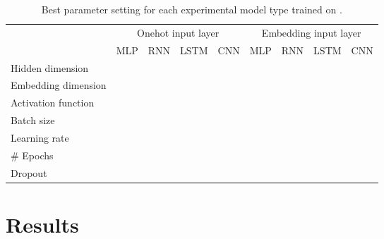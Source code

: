 \begin{table}[]
\centering
\begin{tabular}{lllll|llll}
                    & \multicolumn{4}{c|}{Onehot input layer} & \multicolumn{4}{c}{Embedding input layer}\\
                    & MLP     & RNN     & LSTM     & CNN     & MLP      & RNN      & LSTM      & CNN     \\\hline
Hidden dimension    &         &         &          &         &          &          &           &         \\
Embedding dimension &         &         &          &         &          &          &           &         \\
Activation function &         &         &          &         &          &          &           &         \\
Batch size          &         &         &          &         &          &          &           &         \\
Learning rate       &         &         &          &         &          &          &           &         \\
# Epochs            &         &         &          &         &          &          &           &         \\
Dropout             &         &         &          &         &          &          &           &
\end{tabular}
\caption{Best parameter setting for each experimental model type trained on \citet{Wulczyn:2017}.}
\label{tab:exp_model_parameters_wulczyn}
\end{table}


\section{Results}

